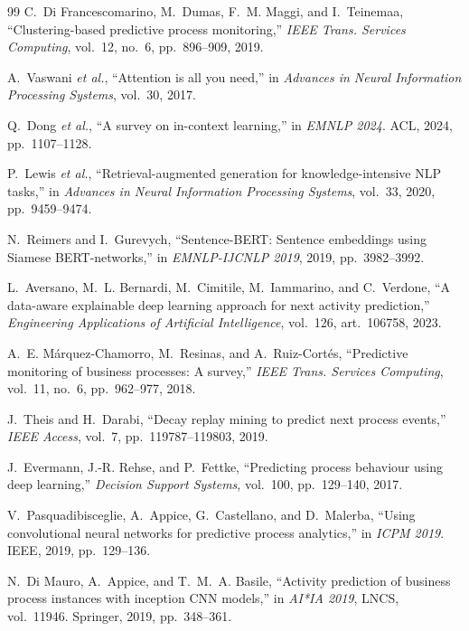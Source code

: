 \documentclass[a4paper,12pt,oneside]{report}
\begin{document}
\begin{thebibliography}{99}
 C.~Di Francescomarino, M.~Dumas, F.~M. Maggi, and I.~Teinemaa, ``Clustering-based predictive process monitoring,'' \textit{IEEE Trans. Services Computing}, vol.~12, no.~6, pp.~896--909, 2019.

 A.~Vaswani \textit{et al.}, ``Attention is all you need,'' in \textit{Advances in Neural Information Processing Systems}, vol.~30, 2017.

 Q.~Dong \textit{et al.}, ``A survey on in-context learning,'' in \textit{EMNLP 2024}. ACL, 2024, pp.~1107--1128.

 P.~Lewis \textit{et al.}, ``Retrieval-augmented generation for knowledge-intensive NLP tasks,'' in \textit{Advances in Neural Information Processing Systems}, vol.~33, 2020, pp.~9459--9474.

 N.~Reimers and I.~Gurevych, ``Sentence-BERT: Sentence embeddings using Siamese BERT-networks,'' in \textit{EMNLP-IJCNLP 2019}, 2019, pp.~3982--3992.

 L.~Aversano, M.~L. Bernardi, M.~Cimitile, M.~Iammarino, and C.~Verdone, ``A data-aware explainable deep learning approach for next activity prediction,'' \textit{Engineering Applications of Artificial Intelligence}, vol.~126, art.~106758, 2023.

 A.~E. Márquez-Chamorro, M.~Resinas, and A.~Ruiz-Cortés, ``Predictive monitoring of business processes: A survey,'' \textit{IEEE Trans. Services Computing}, vol.~11, no.~6, pp.~962--977, 2018.

 J.~Theis and H.~Darabi, ``Decay replay mining to predict next process events,'' \textit{IEEE Access}, vol.~7, pp.~119787--119803, 2019.

 J.~Evermann, J.-R. Rehse, and P.~Fettke, ``Predicting process behaviour using deep learning,'' \textit{Decision Support Systems}, vol.~100, pp.~129--140, 2017.

 V.~Pasquadibisceglie, A.~Appice, G.~Castellano, and D.~Malerba, ``Using convolutional neural networks for predictive process analytics,'' in \textit{ICPM 2019}. IEEE, 2019, pp.~129--136.

 N.~Di Mauro, A.~Appice, and T.~M.~A. Basile, ``Activity prediction of business process instances with inception CNN models,'' in \textit{AI*IA 2019}, LNCS, vol.~11946. Springer, 2019, pp.~348--361.


\end{thebibliography}
\end{document}
